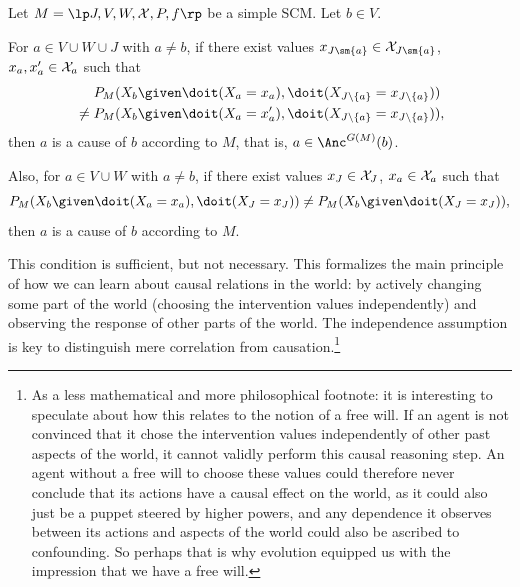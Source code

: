 \begin{Cor}\label{cor:scm_identify_causal_relation}
  Let $M = \lt \Sin, \Send, \Srnd, \CX, P, f \rt$ be a simple SCM.
  Let $b \in V$.

  For $a \in V \cup W \cup J$ with $a \ne b$, if
  there exist values $x_{J\sm\{a\}} \in \CX_{J\sm\{a\}}$, $x_a,x_a' \in \mathcal{X}_a$ such that
      \begin{equation*}\begin{split}
        & P_{M}(X_b \given \doit(X_a=x_a),\doit(X_{J\setminus \{a\}}=x_{J\setminus \{a\}})) \\
        {} \ne {} & P_{M}(X_b \given \doit(X_a=x_a'),\doit(X_{J\setminus\{a\}}=x_{J\setminus\{a\}})),
      \end{split}\end{equation*}
  then $a$ is a cause of $b$ according to $M$, that is, $a \in \Anc^{G(M)}(b)$.

  Also, for $a \in V \cup W$ with $a \ne b$, if
  there exist values $x_J \in \mathcal{X}_J$, $x_a \in \mathcal{X}_a$ such that
  $$P_{M}(X_b \given \doit(X_a=x_a),\doit(X_J=x_J)) \ne P_{M}(X_b \given \doit(X_J=x_J)),$$
  then $a$ is a cause of $b$ according to $M$.  
\end{Cor}
This condition is sufficient, but not necessary.
This formalizes the main principle of how we can learn about causal relations in
the world: by actively changing some part of the world (choosing the intervention values independently) and observing
the response of other parts of the world.
The independence assumption is key to distinguish mere correlation from causation.\footnote{As a less mathematical
and more philosophical footnote: it is interesting
to speculate about how this relates to the notion of a free will. 
If an agent is not convinced that it chose the intervention values independently of other past
aspects of the world, it cannot validly perform this causal reasoning step. An agent without a free will
to choose these values could therefore never conclude that its actions have a causal effect on the world,
as it could also just be a puppet steered by higher powers, and any dependence it observes between its actions 
and aspects of the world 
could also be ascribed to confounding. So perhaps that is why evolution equipped us with the impression that we have a free will.}

